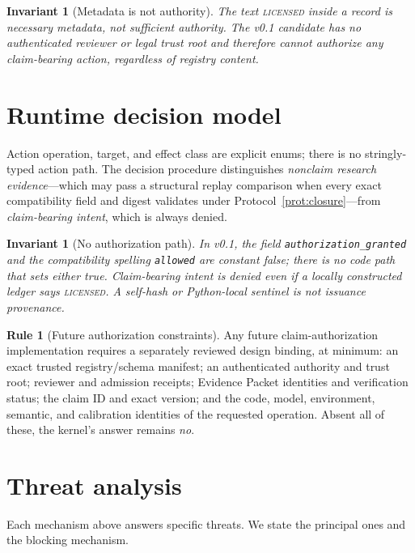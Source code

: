 \documentclass[11pt]{amsart}
\newtheorem{invariant}[theorem]{Invariant}
\theoremstyle{definition}
\newtheorem{ruleenv}[theorem]{Rule}
\theoremstyle{remark}
\begin{document}
\begin{invariant}[Metadata is not authority]\label{inv:metadata}
The text \textsc{licensed} inside a record is necessary metadata, not sufficient authority. The v0.1 candidate has no authenticated reviewer or legal trust root and therefore cannot authorize any claim-bearing action, regardless of registry content.
\end{invariant}

\section{Runtime decision model}\label{sec:runtime}

Action operation, target, and effect class are explicit enums; there is no stringly-typed action path. The decision procedure distinguishes \emph{nonclaim research evidence}---which may pass a structural replay comparison when every exact compatibility field and digest validates under Protocol~\ref{prot:closure}---from \emph{claim-bearing intent}, which is always denied.

\begin{invariant}[No authorization path]\label{inv:noauth}
In v0.1, the field \texttt{authorization\_granted} and the compatibility spelling \texttt{allowed} are constant \emph{false}; there is no code path that sets either true. Claim-bearing intent is denied even if a locally constructed ledger says \textsc{licensed}. A self-hash or Python-local sentinel is not issuance provenance.
\end{invariant}

\begin{ruleenv}[Future authorization constraints]\label{rule:futureauth}
Any future claim-authorization implementation requires a separately reviewed design binding, at minimum: an exact trusted registry/schema manifest; an authenticated authority and trust root; reviewer and admission receipts; Evidence Packet identities and verification status; the claim ID and exact version; and the code, model, environment, semantic, and calibration identities of the requested operation. Absent all of these, the kernel's answer remains \emph{no}.
\end{ruleenv}

\section{Threat analysis}\label{sec:threats}

Each mechanism above answers specific threats. We state the principal ones and the blocking mechanism.
\end{document}
